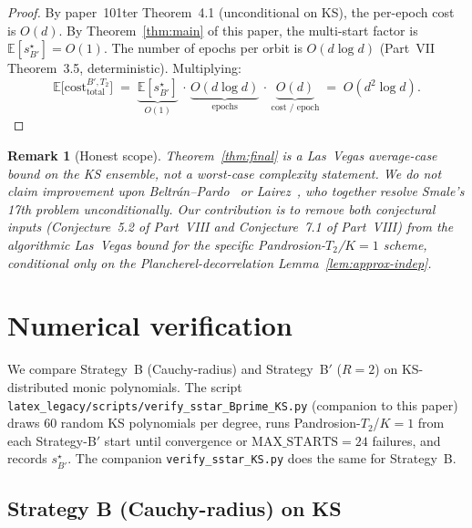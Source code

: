 \documentclass[11pt,a4paper]{article}
\newtheorem{remark}[theorem]{Remark}
\begin{document}
\begin{proof}
By paper~101ter Theorem~4.1 (unconditional on KS), the per-epoch cost is $O(d)$. By Theorem~\ref{thm:main} of this paper, the multi-start factor is $\mathbb{E}[s^\star_{B'}] = O(1)$. The number of epochs per orbit is $O(d \log d)$ (Part~VII Theorem~3.5, deterministic). Multiplying:
$$
\mathbb{E}\bigl[\mathrm{cost}^{B',T_2}_{\text{total}}\bigr]
\;=\;
\underbrace{\mathbb{E}[s^\star_{B'}]}_{O(1)}
\,\cdot\,
\underbrace{O(d \log d)}_{\text{epochs}}
\,\cdot\,
\underbrace{O(d)}_{\text{cost / epoch}}
\;=\;
O(d^{2}\log d).
$$
\end{proof}

\begin{remark}[Honest scope]
Theorem~\ref{thm:final} is a Las~Vegas average-case bound on the KS ensemble, not a worst-case complexity statement. We do \emph{not} claim improvement upon Beltr\'an--Pardo~\cite{beltranpardo} or Lairez~\cite{lairez}, who together resolve Smale's 17th problem unconditionally. Our contribution is to remove both conjectural inputs (Conjecture~5.2 of Part~VIII and Conjecture~7.1 of Part~VIII) from the algorithmic Las~Vegas bound for the specific Pandrosion-$T_2$/$K{=}1$ scheme, conditional only on the Plancherel-decorrelation Lemma~\ref{lem:approx-indep}.
\end{remark}

\section{Numerical verification}\label{sec:numerics}

We compare Strategy~B (Cauchy-radius) and Strategy~B$'$ ($R = 2$) on KS-distributed monic polynomials. The script \verb|latex_legacy/scripts/verify_sstar_Bprime_KS.py| (companion to this paper) draws $60$ random KS polynomials per degree, runs Pandrosion-$T_2$/$K{=}1$ from each Strategy-B$'$ start until convergence or $\text{MAX\_STARTS} = 24$ failures, and records $s^\star_{B'}$. The companion \verb|verify_sstar_KS.py| does the same for Strategy~B.

\subsection{Strategy B (Cauchy-radius) on KS}
\end{document}
